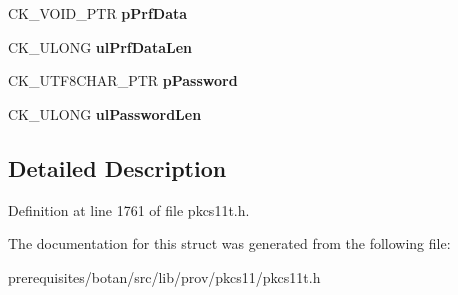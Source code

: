 \begin{DoxyCompactItemize}
C\+K\+\_\+\+V\+O\+I\+D\+\_\+\+P\+TR {\bfseries p\+Prf\+Data}
\item 
\mbox{\label{struct_c_k___p_k_c_s5___p_b_k_d2___p_a_r_a_m_s2_a333ee4ba4300451919a99bfa0b31202d}} 
C\+K\+\_\+\+U\+L\+O\+NG {\bfseries ul\+Prf\+Data\+Len}
\item 
\mbox{\label{struct_c_k___p_k_c_s5___p_b_k_d2___p_a_r_a_m_s2_a9c1f86c66b96fda9146b4179b75e0861}} 
C\+K\+\_\+\+U\+T\+F8\+C\+H\+A\+R\+\_\+\+P\+TR {\bfseries p\+Password}
\item 
\mbox{\label{struct_c_k___p_k_c_s5___p_b_k_d2___p_a_r_a_m_s2_ab6829fe6dc5823e2e4ac25b058afe294}} 
C\+K\+\_\+\+U\+L\+O\+NG {\bfseries ul\+Password\+Len}
\end{DoxyCompactItemize}


\subsection{Detailed Description}


Definition at line 1761 of file pkcs11t.\+h.



The documentation for this struct was generated from the following file\+:\begin{DoxyCompactItemize}
\item 
prerequisites/botan/src/lib/prov/pkcs11/pkcs11t.\+h\end{DoxyCompactItemize}
